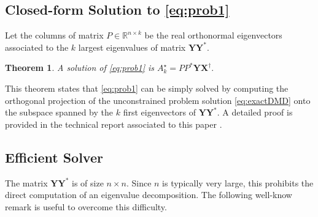 \documentclass{article}
\newcommand{\Rr}{\mathds{R}}
\newcommand{\R}{P}
\newcommand{\Q}{Q}
\newcommand{\AAA}{\mathbf{X}}
\newcommand{\BBB}{\mathbf{Y}}
\newcommand{\ie}{\textit{i.e.}, }
\newtheorem{theorem}{Theorem}
\begin{document}
\subsection{Closed-form Solution to \eqref{eq:prob1}}
  Let the columns of matrix  $\R \in \Rr^{n \times k}$  be the real orthonormal  eigenvectors  associated  to the  $k$ largest  eigenvalues  of    matrix  $\BBB\BBB^*.$    
\begin{theorem}\label{prop22}
A solution of \eqref{eq:prob1}  is $A_k^\star=\R  \R^*\BBB \AAA^{\dagger}.$

 \end{theorem}
This theorem states that \eqref{eq:prob1} can be  simply solved by computing the orthogonal projection of the    unconstrained problem solution \eqref{eq:exactDMD}  onto the subspace spanned by the $k$ first eigenvectors of $\BBB \BBB^*$. A detailed proof is provided in {the technical report associated to this paper \cite{Heas16_DMD}.}  


 
\subsection{{Efficient} Solver}

The matrix $\BBB\BBB^*$ is  of size $n\times n$.   {Since $n$ is typically very large, t}his prohibits the direct computation of an eigenvalue decomposition. %
The following well-know remark is useful to overcome this difficulty.  \\
\end{document}
